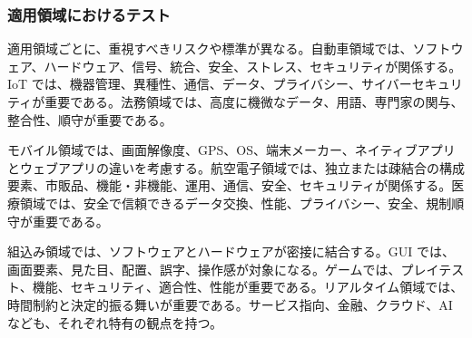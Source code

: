 \subsubsection{適用領域におけるテスト}
適用領域ごとに、重視すべきリスクや標準が異なる。自動車領域では、ソフトウェア、ハードウェア、信号、統合、安全、ストレス、セキュリティが関係する。IoT では、機器管理、異種性、通信、データ、プライバシー、サイバーセキュリティが重要である。法務領域では、高度に機微なデータ、用語、専門家の関与、整合性、順守が重要である。

モバイル領域では、画面解像度、GPS、OS、端末メーカー、ネイティブアプリとウェブアプリの違いを考慮する。航空電子領域では、独立または疎結合の構成要素、市販品、機能・非機能、運用、通信、安全、セキュリティが関係する。医療領域では、安全で信頼できるデータ交換、性能、プライバシー、安全、規制順守が重要である。

組込み領域では、ソフトウェアとハードウェアが密接に結合する。GUI では、画面要素、見た目、配置、誤字、操作感が対象になる。ゲームでは、プレイテスト、機能、セキュリティ、適合性、性能が重要である。リアルタイム領域では、時間制約と決定的振る舞いが重要である。サービス指向、金融、クラウド、AI なども、それぞれ特有の観点を持つ。

